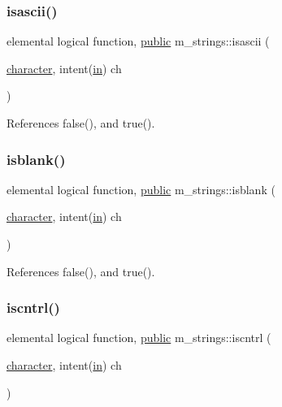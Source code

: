 \mbox{\label{namespacem__strings_afb63e9fefbc04e4e9a2ec4df4334078c}} 
\subsubsection{\texorpdfstring{isascii()}{isascii()}}
{\footnotesize\ttfamily elemental logical function, \hyperlink{M__stopwatch_83_8txt_a2f74811300c361e53b430611a7d1769f}{public} m\+\_\+strings\+::isascii (\begin{DoxyParamCaption}\item[{\hyperlink{option__stopwatch_83_8txt_abd4b21fbbd175834027b5224bfe97e66}{character}, intent(\hyperlink{M__journal_83_8txt_afce72651d1eed785a2132bee863b2f38}{in})}]{ch }\end{DoxyParamCaption})}



References false(), and true().

\mbox{\label{namespacem__strings_aebb074d3971c0b93e39d1cfaa45658d8}} 
\subsubsection{\texorpdfstring{isblank()}{isblank()}}
{\footnotesize\ttfamily elemental logical function, \hyperlink{M__stopwatch_83_8txt_a2f74811300c361e53b430611a7d1769f}{public} m\+\_\+strings\+::isblank (\begin{DoxyParamCaption}\item[{\hyperlink{option__stopwatch_83_8txt_abd4b21fbbd175834027b5224bfe97e66}{character}, intent(\hyperlink{M__journal_83_8txt_afce72651d1eed785a2132bee863b2f38}{in})}]{ch }\end{DoxyParamCaption})}



References false(), and true().

\mbox{\label{namespacem__strings_a4821cb5a5c4024c9dc6dd159300034ca}} 
\subsubsection{\texorpdfstring{iscntrl()}{iscntrl()}}
{\footnotesize\ttfamily elemental logical function, \hyperlink{M__stopwatch_83_8txt_a2f74811300c361e53b430611a7d1769f}{public} m\+\_\+strings\+::iscntrl (\begin{DoxyParamCaption}\item[{\hyperlink{option__stopwatch_83_8txt_abd4b21fbbd175834027b5224bfe97e66}{character}, intent(\hyperlink{M__journal_83_8txt_afce72651d1eed785a2132bee863b2f38}{in})}]{ch }\end{DoxyParamCaption})}



